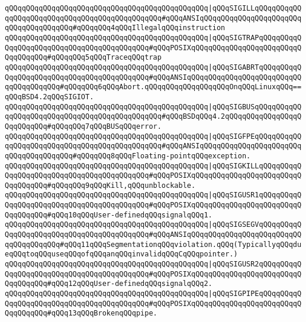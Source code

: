 \verb|qQQqqQQqqQQqqQQqqQQqqQQqqQQqqQQqqQQqqQQqqQQqqQQq|\verb#|qQQqSIGILLqQQqqQQqqQQqqQQqqQQqqQQqqQQqqQQqqQQqqQQqqQQqqQQq#\verb|#qQQqANSIqQQqqQQqqQQqqQQqqQQqqQQqqQQqqQQqqQQqqQQq#qQQqqQQq4qQQqIllegalqQQqinstruction|\newline
\verb|qQQqqQQqqQQqqQQqqQQqqQQqqQQqqQQqqQQqqQQqqQQqqQQq|\verb#|qQQqSIGTRAPqQQqqQQqqQQqqQQqqQQqqQQqqQQqqQQqqQQqqQQqqQQq#\verb|#qQQqPOSIXqQQqqQQqqQQqqQQqqQQqqQQqqQQqqQQqqQQq#qQQqqQQq5qQQqTraceqQQqtrap|\newline
\verb|qQQqqQQqqQQqqQQqqQQqqQQqqQQqqQQqqQQqqQQqqQQqqQQq|\verb#|qQQqSIGABRTqQQqqQQqqQQqqQQqqQQqqQQqqQQqqQQqqQQqqQQqqQQq#\verb|#qQQqANSIqQQqqQQqqQQqqQQqqQQqqQQqqQQqqQQqqQQqqQQq#qQQqqQQq6qQQqAbort.qQQqqQQqqQQqqQQqqQQqOnqQQqLinuxqQQq==qQQqBSD4.2qQQqSIGIOT.|\newline
\verb|qQQqqQQqqQQqqQQqqQQqqQQqqQQqqQQqqQQqqQQqqQQqqQQq|\verb#|qQQqSIGBUSqQQqqQQqqQQqqQQqqQQqqQQqqQQqqQQqqQQqqQQqqQQqqQQq#\verb|#qQQqBSDqQQq4.2qQQqqQQqqQQqqQQqqQQqqQQqqQQq#qQQqqQQq7qQQqBUSqQQqerror.|\newline
\verb|qQQqqQQqqQQqqQQqqQQqqQQqqQQqqQQqqQQqqQQqqQQqqQQq|\verb#|qQQqSIGFPEqQQqqQQqqQQqqQQqqQQqqQQqqQQqqQQqqQQqqQQqqQQqqQQq#\verb|#qQQqANSIqQQqqQQqqQQqqQQqqQQqqQQqqQQqqQQqqQQqqQQq#qQQqqQQq8qQQqFloating-pointqQQqexception.|\newline
\verb|qQQqqQQqqQQqqQQqqQQqqQQqqQQqqQQqqQQqqQQqqQQqqQQq|\verb#|qQQqSIGKILLqQQqqQQqqQQqqQQqqQQqqQQqqQQqqQQqqQQqqQQqqQQq#\verb|#qQQqPOSIXqQQqqQQqqQQqqQQqqQQqqQQqqQQqqQQqqQQq#qQQqqQQq9qQQqKill,qQQqunblockable.|\newline
\verb|qQQqqQQqqQQqqQQqqQQqqQQqqQQqqQQqqQQqqQQqqQQqqQQq|\verb#|qQQqSIGUSR1qQQqqQQqqQQqqQQqqQQqqQQqqQQqqQQqqQQqqQQqqQQq#\verb|#qQQqPOSIXqQQqqQQqqQQqqQQqqQQqqQQqqQQqqQQqqQQq#qQQq10qQQqUser-definedqQQqsignalqQQq1.|\newline
\verb|qQQqqQQqqQQqqQQqqQQqqQQqqQQqqQQqqQQqqQQqqQQqqQQq|\verb#|qQQqSIGSEGVqQQqqQQqqQQqqQQqqQQqqQQqqQQqqQQqqQQqqQQqqQQq#\verb|#qQQqANSIqQQqqQQqqQQqqQQqqQQqqQQqqQQqqQQqqQQqqQQq#qQQq11qQQqSegmentationqQQqviolation.qQQq(TypicallyqQQqdueqQQqtoqQQquseqQQqofqQQqanqQQqinvalidqQQqCqQQqpointer.)|\newline
\verb|qQQqqQQqqQQqqQQqqQQqqQQqqQQqqQQqqQQqqQQqqQQqqQQq|\verb#|qQQqSIGUSR2qQQqqQQqqQQqqQQqqQQqqQQqqQQqqQQqqQQqqQQqqQQq#\verb|#qQQqPOSIXqQQqqQQqqQQqqQQqqQQqqQQqqQQqqQQqqQQq#qQQq12qQQqUser-definedqQQqsignalqQQq2.|\newline
\verb|qQQqqQQqqQQqqQQqqQQqqQQqqQQqqQQqqQQqqQQqqQQqqQQq|\verb#|qQQqSIGPIPEqQQqqQQqqQQqqQQqqQQqqQQqqQQqqQQqqQQqqQQqqQQq#\verb|#qQQqPOSIXqQQqqQQqqQQqqQQqqQQqqQQqqQQqqQQqqQQq#qQQq13qQQqBrokenqQQqpipe.|\newline
